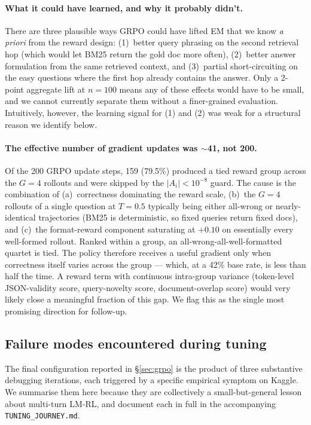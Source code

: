 \documentclass[11pt]{article}
\begin{document}
\paragraph{What it could have learned, and why it probably didn't.}
There are three plausible ways GRPO could have lifted EM that we
know \emph{a priori} from the reward design: (1)~better query
phrasing on the second retrieval hop (which would let BM25 return
the gold doc more often), (2)~better answer formulation from the
same retrieved context, and (3)~partial short-circuiting on the
easy questions where the first hop already contains the answer.
Only a 2-point aggregate lift at $n{=}100$ means any of these
effects would have to be small, and we cannot currently separate
them without a finer-grained evaluation. Intuitively, however, the
learning signal for (1) and (2) was weak for a structural reason
we identify below.

\paragraph{The effective number of gradient updates was $\sim$41, not 200.}
Of the 200 GRPO update steps, 159 (79.5\%) produced a tied reward
group across the $G{=}4$ rollouts and were skipped by the
$|A_i|<10^{-8}$ guard. The cause is the combination of
(a)~correctness dominating the reward scale, (b)~the $G{=}4$
rollouts of a single question at $T{=}0.5$ typically being either
all-wrong or nearly-identical trajectories (BM25 is deterministic,
so fixed queries return fixed docs), and (c)~the format-reward
component saturating at $+0.10$ on essentially every well-formed
rollout. Ranked within a group, an all-wrong-all-well-formatted
quartet is tied. The policy therefore receives a useful gradient
only when correctness itself varies across the group --- which, at
a 42\% base rate, is less than half the time. A reward term with
continuous intra-group variance (token-level JSON-validity score,
query-novelty score, document-overlap score) would very likely
close a meaningful fraction of this gap. We flag this as the
single most promising direction for follow-up.

\subsection{Failure modes encountered during tuning}
\label{sec:failure-modes}

The final configuration reported in §\ref{sec:grpo} is the product
of three substantive debugging iterations, each triggered by a
specific empirical symptom on Kaggle. We summarise them here
because they are collectively a small-but-general lesson about
multi-turn LM-RL, and document each in full in the accompanying
\texttt{TUNING\_JOURNEY.md}.
\end{document}
